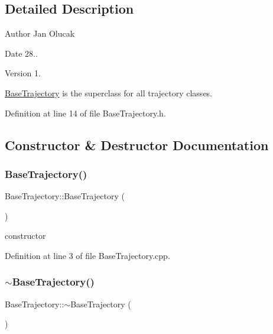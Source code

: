 \subsection{Detailed Description}
\begin{DoxyAuthor}{Author}
Jan Olucak 
\end{DoxyAuthor}
\begin{DoxyDate}{Date}
28.. 
\end{DoxyDate}
\begin{DoxyVersion}{Version}
1.
\end{DoxyVersion}
\hyperlink{class_base_trajectory}{Base\+Trajectory} is the superclass for all trajectory classes. 

Definition at line 14 of file Base\+Trajectory.\+h.



\subsection{Constructor \& Destructor Documentation}
\mbox{\label{class_base_trajectory_adeb5dac46dd0e10c53c121abb3cddae2}} 
\subsubsection{\texorpdfstring{Base\+Trajectory()}{BaseTrajectory()}}
{\footnotesize\ttfamily Base\+Trajectory\+::\+Base\+Trajectory (\begin{DoxyParamCaption}{ }\end{DoxyParamCaption})}



constructor 



Definition at line 3 of file Base\+Trajectory.\+cpp.

\mbox{\label{class_base_trajectory_a69beb2e4fc2431d2f150751390bfcfbc}} 
\subsubsection{\texorpdfstring{$\sim$\+Base\+Trajectory()}{~BaseTrajectory()}}
{\footnotesize\ttfamily Base\+Trajectory\+::$\sim$\+Base\+Trajectory (\begin{DoxyParamCaption}{ }\end{DoxyParamCaption})}



